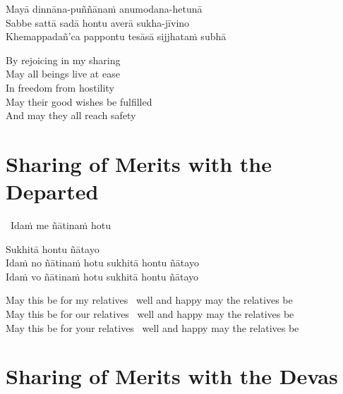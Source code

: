 Mayā dinnāna-puññānaṁ anumodana-hetunā\\
Sabbe sattā sadā hontu averā sukha-jīvino\\
Khemappadañ'ca pappontu tesāsā sijjhataṁ subhā

\begin{english-verses}
  By rejoicing in my sharing\\
  May all beings live at ease\\
  In freedom from hostility\\
  May their good wishes be fulfilled\\
  And may they all reach safety
\end{english-verses}

\suttaRef{[Thai]}


\section{Sharing of Merits with the Departed}
\label{sharing-merits-departed}

\begin{leader-only}
  \anglebracketleft\ \hspace{-0.5mm}Idaṁ me ñātinaṁ hotu \hspace{-0.5mm}\anglebracketright\
\end{leader-only}

\vspace{-0.99em}
Sukhitā hontu ñātayo\\
Idaṁ no ñātinaṁ hotu sukhitā hontu ñātayo\\
Idaṁ vo ñātinaṁ hotu sukhitā hontu ñātayo

\begin{english-verses}
  May this be for my relatives \breathmark\ well and happy may the relatives be\\
  May this be for our relatives \breathmark\ well and happy may the relatives be\\
  May this be for your relatives \breathmark\ well and happy may the relatives be
\end{english-verses}

\suttaRef{[Thai]}


\section{Sharing of Merits with the Devas}
\label{sharing-merits-devas}

